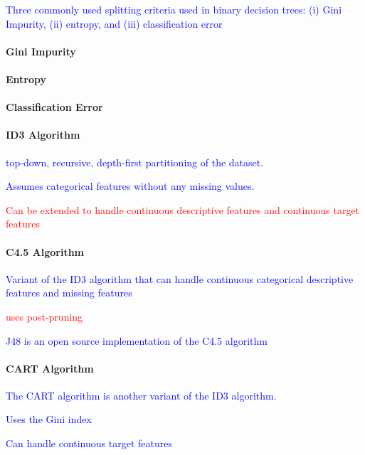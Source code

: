 \textcolor{blue}{Three commonly used splitting criteria used in binary decision trees: (i) Gini Impurity, (ii) entropy, and (iii) classification error}

\paragraph{Gini Impurity}

\paragraph{Entropy}

\paragraph{Classification Error}

\paragraph{ID3 Algorithm}

\textcolor{blue}{top-down, recursive, depth-first partitioning of the dataset.}

\textcolor{blue}{Assumes categorical features without any missing values.}

\textcolor{red}{Can be extended to handle continuous descriptive features and continuous target features}

\paragraph{C4.5 Algorithm}

\textcolor{blue}{Variant of the {ID3 algorithm} that can handle continuous categorical descriptive features and missing features}

\textcolor{red}{uses post-pruning}

\textcolor{blue}{{J48} is an open source implementation of the C4.5 algorithm}

\paragraph{CART Algorithm}

\textcolor{blue}{The CART algorithm is another variant of the ID3 algorithm.}

\textcolor{blue}{Uses the Gini index}

\textcolor{blue}{Can handle continuous target features}

